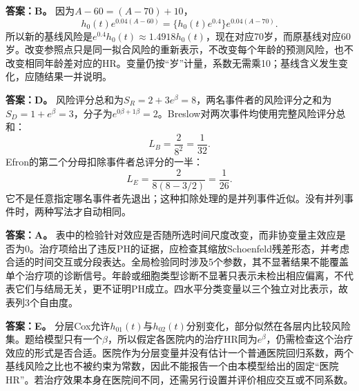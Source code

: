 \textbf{答案：B。} 因为$A-60=(A-70)+10$，
\[
h_0(t)e^{0.04(A-60)}
=\{h_0(t)e^{0.4}\}e^{0.04(A-70)}.
\]
所以新的基线风险是$e^{0.4}h_0(t)\approx1.4918h_0(t)$，现在对应70岁，而原基线对应60岁。改变参照点只是同一拟合风险的重新表示，不改变每个年龄的预测风险，也不改变相同年龄差对应的HR。变量仍按“岁”计量，系数无需乘10；基线含义发生变化，应随结果一并说明。
\par\nobreak\smallskip{}

\textbf{答案：D。} 风险评分总和为$S_R=2+3e^\beta=8$，两名事件者的风险评分之和为$S_D=1+e^\beta=3$，分子为$e^{0\beta+1\beta}=2$。Breslow对两次事件均使用完整风险评分总和：
\[
L_B=\frac{2}{8^2}=\frac1{32}.
\]
Efron的第二个分母扣除事件者总评分的一半：
\[
L_E=\frac{2}{8(8-3/2)}=\frac1{26}.
\]
它不是任意指定哪名事件者先退出；这种扣除处理的是并列事件近似。没有并列事件时，两种写法才自动相同。
\par\nobreak\smallskip{}

\textbf{答案：A。} 表中的检验针对效应是否随所选时间尺度改变，而非协变量主效应是否为0。治疗项给出了违反PH的证据，应检查其缩放Schoenfeld残差形态，并考虑合适的时间交互或分段表达。全局检验同时涉及5个参数，其不显著结果不能覆盖单个治疗项的诊断信号。年龄或细胞类型诊断不显著只表示未检出相应偏离，不代表它们与结局无关，更不证明PH成立。四水平分类变量以三个独立对比表示，故表列3个自由度。
\par\nobreak\smallskip{}

\textbf{答案：E。} 分层Cox允许$h_{01}(t)$与$h_{02}(t)$分别变化，部分似然在各层内比较风险集。题给模型只有一个$\beta$，所以假定各医院内的治疗HR同为$e^\beta$，仍需检查这个治疗效应的形式是否合适。医院作为分层变量并没有估计一个普通医院回归系数，两个基线风险之比也不被约束为常数，因此不能报告一个由本模型给出的固定“医院HR”。若治疗效果本身在医院间不同，还需另行设置并评价相应交互或不同系数。
\par\nobreak\smallskip{}

